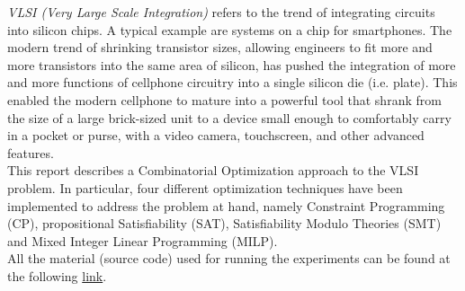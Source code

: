 \textit{VLSI (Very Large Scale Integration)} refers to the trend of integrating circuits into
silicon chips. A typical example are systems on a chip for smartphones. The modern trend of
shrinking transistor sizes, allowing engineers to fit more and more transistors into the same area 
of silicon, has pushed the integration of more and more functions of cellphone circuitry into a 
single silicon die (i.e. plate). This enabled the modern cellphone to mature into a powerful tool 
that shrank from the size of a large brick-sized unit to a device small enough to comfortably carry
in a pocket or purse, with a video camera, touchscreen, and other advanced features. \\

This report describes a Combinatorial Optimization approach to the VLSI problem. In particular,
four different optimization techniques have been implemented to address the problem at hand, namely Constraint
Programming (CP), propositional Satisfiability (SAT), Satisfiability Modulo Theories (SMT) and
Mixed Integer Linear Programming (MILP). \\

All the material (source code) used for running the experiments can be found at the following
\href{https://github.com/contimatteo/VLSI}{link}.
